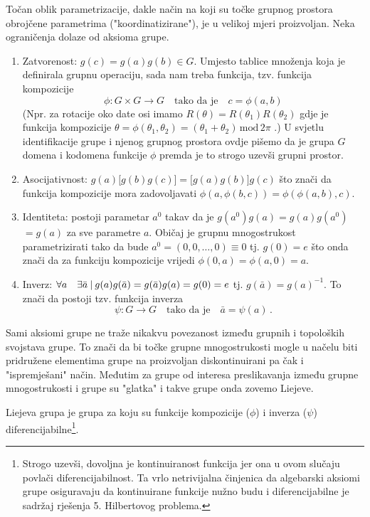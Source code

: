 Točan oblik parametrizacije, dakle način na koji su točke grupnog prostora obrojčene
parametrima ("koordinatizirane"), je u velikoj mjeri proizvoljan.
Neka ograničenja dolaze od aksioma grupe.
\begin{enumerate}
\item Zatvorenost: $g(c)=g(a)g(b) \in G$. Umjesto tablice množenja koja
    je definirala grupnu operaciju, sada nam treba funkcija, tzv.
    funkcija kompozicije
    \[\phi: G\times G \to G \quad  \text{tako da je} \quad c=\phi(a,b) \]
    (Npr. za rotacije oko date osi imamo $R(\theta) = R(\theta_1) R(\theta_2)$
    gdje je funkcija kompozicije  $\theta = \phi(\theta_1, \theta_2) =
    (\theta_1 + \theta_2)\, \mathrm{mod}\, 2\pi$ .) U svjetlu identifikacije
    grupe i njenog grupnog prostora ovdje pišemo da je grupa $G$ domena i kodomena funkcije $\phi$
    premda je to strogo uzevši grupni prostor. 

\item Asocijativnost: $g(a)\big[g(b)g(c)\big]=\big[g(a)g(b)\big]g(c)$ što
    znači da funkcija kompozicije mora zadovoljavati
    $\phi(a, \phi(b,c))=\phi(\phi(a,b),c)$. 

\item Identiteta: postoji parametar $a^0$ takav da je 
       $g(a^0)g(a)$$=g(a)g(a^0)$$=g(a)$ za sve parametre $a$.
    Običaj je grupnu mnogostrukost parametrizirati tako da bude $a^0=(0, 0, \ldots, 0)
     \equiv 0$ tj. $g(0)=e$ što onda znači da za funkciju
     kompozicije vrijedi $\phi(0,a)=\phi(a,0)=a$. 

\item Inverz: $\forall a\quad \exists \bar{a} \: | \: g(a)g(\bar{a})=
        g(\bar{a})g(a)=g(0)=e$ tj. $g(\bar{a})=g(a)^{-1}$. To znači
        da postoji tzv. funkcija inverza 
        \[ \psi:G\to G   \quad  \text{tako da je} \quad \bar{a}=\psi(a) \,. \]

\end{enumerate}

Sami aksiomi grupe ne traže nikakvu povezanost između grupnih i topoloških
svojstava grupe. To znači da bi točke grupne mnogostrukosti mogle u načelu biti
pridružene elementima grupe na proizvoljan diskontinuirani pa čak i "ispremješani"
način. Međutim za grupe od interesa preslikavanja između grupne mnogostrukosti
i grupe su "glatka" i takve grupe onda zovemo Liejeve.

\begin{definicija}
  Liejeva grupa je grupa za koju su funkcije kompozicije
($\phi$) i inverza ($\psi$) diferencijabilne\footnote{Strogo uzevši, 
    dovoljna je kontinuiranost funkcija jer ona u ovom slučaju povlači diferencijabilnost.
 Ta vrlo netrivijalna činjenica da algebarski aksiomi
 grupe osiguravaju da kontinuirane funkcije nužno budu i diferencijabilne
 je sadržaj rješenja 5. Hilbertovog problema.}.
\end{definicija}

